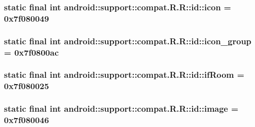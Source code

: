 \hypertarget{classandroid_1_1support_1_1compat_1_1_r_1_1id_5cea2fd7ed2868db92c43d6f576046ef}{
\subsubsection[{icon}]{\setlength{\rightskip}{0pt plus 5cm}static final int android::support::compat.R.R::id::icon = 0x7f080049}}
\label{classandroid_1_1support_1_1compat_1_1_r_1_1id_5cea2fd7ed2868db92c43d6f576046ef}


\hypertarget{classandroid_1_1support_1_1compat_1_1_r_1_1id_ab645b8d3d49b2cb588e88343af7c224}{
\subsubsection[{icon\_\-group}]{\setlength{\rightskip}{0pt plus 5cm}static final int android::support::compat.R.R::id::icon\_\-group = 0x7f0800ac}}
\label{classandroid_1_1support_1_1compat_1_1_r_1_1id_ab645b8d3d49b2cb588e88343af7c224}


\hypertarget{classandroid_1_1support_1_1compat_1_1_r_1_1id_bc1fdc279833dd2d32be77c58fbeda31}{
\subsubsection[{ifRoom}]{\setlength{\rightskip}{0pt plus 5cm}static final int android::support::compat.R.R::id::ifRoom = 0x7f080025}}
\label{classandroid_1_1support_1_1compat_1_1_r_1_1id_bc1fdc279833dd2d32be77c58fbeda31}


\hypertarget{classandroid_1_1support_1_1compat_1_1_r_1_1id_64c2e64c6f65ac01b432d6f47eb01aeb}{
\subsubsection[{image}]{\setlength{\rightskip}{0pt plus 5cm}static final int android::support::compat.R.R::id::image = 0x7f080046}}
\label{classandroid_1_1support_1_1compat_1_1_r_1_1id_64c2e64c6f65ac01b432d6f47eb01aeb}



